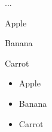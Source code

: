\documentclass{article}
\newcommand\mydescformat[1]{!!! #1 ...}
\newcommand\mybulletformat{\small\textbullet}
\begin{document}
\begin{description}[format=\mydescformat]
    \item[A] Apple
    \item[B] Banana
    \item[C] Carrot
\end{description}

\begin{itemize}[label=\mybulletformat]
    \item Apple
    \item Banana
    \item Carrot
\end{itemize}
\end{document}
